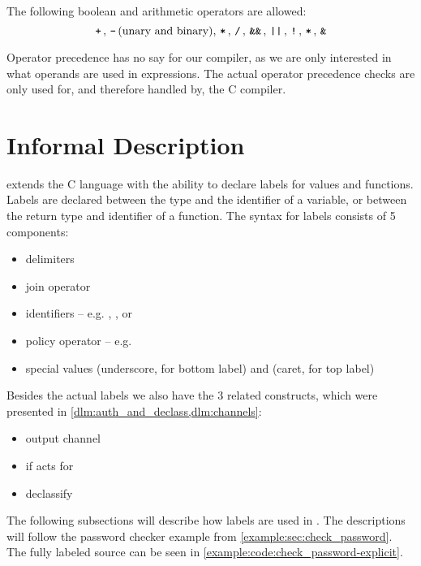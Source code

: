 The following boolean and arithmetic operators are allowed:
\[ \, \texttt{+} \,, \, \texttt{-} \, \text{(unary and binary)}, \, \texttt{*} \,, \, \texttt{/} \,, \, \texttt{\&\&} \,, \, \texttt{||} \,, \, \texttt{!} \,, \, \texttt{*} \, , \, \texttt{\&} \, \]

Operator precedence has no say for our compiler, as we are only interested in what operands are used in expressions.
The actual operator precedence checks are only used for, and therefore handled by, the C compiler.

\section{Informal Description}
\thelang{} extends the C language with the ability to declare labels for values and functions.
Labels are declared between the type and the identifier of a variable, or between the return type and identifier of a function.
The syntax for labels consists of 5 components:
\begin{itemize}
  \item delimiters \dlmc{\{\{ \}\}}
  \item join operator \dlmc{;}
  \item identifiers -- e.g. , , or 
  \item policy operator \dlmc{->} -- e.g. 
  \item special values \dlmc{_} (underscore, for bottom label) and \dlmc{^} (caret, for top label)
\end{itemize}

Besides the actual labels we also have the 3 related constructs, which were presented in \cref{dlm:auth_and_declass,dlm:channels}:
\begin{itemize}
  \item output channel 
  \item if acts for 
  \item declassify 
\end{itemize}

The following subsections will describe how labels are used in \thelang.
The descriptions will follow the password checker example from \cref{example:sec:check_password}.
The fully labeled source can be seen in \cref{example:code:check_password-explicit}.



